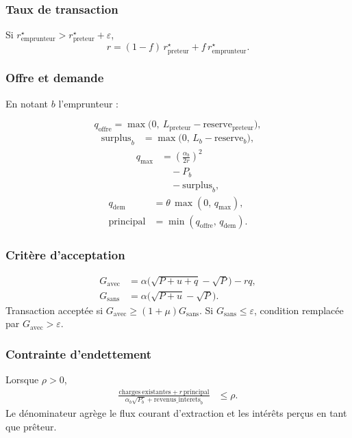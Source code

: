 \documentclass[10pt,a4paper]{article}
\begin{document}
\subsubsection{Taux de transaction}

Si \(r^\star_{\mathrm{emprunteur}} > r^\star_{\mathrm{preteur}} + \varepsilon\),
\[
r = (1-f)\,r^\star_{\mathrm{preteur}} + f\,r^\star_{\mathrm{emprunteur}}.
\]

\subsubsection{Offre et demande}

En notant \(b\) l'emprunteur :

\[
q_{\mathrm{offre}} =
\max\!\bigl(0,\ L_{\mathrm{preteur}}-\mathrm{reserve}_{\mathrm{preteur}}\bigr),
\]
\begin{align*}
\mathrm{surplus}_b
&=
\max\!\bigl(
0,\,
L_b-\mathrm{reserve}_b
\bigr),
\end{align*}
\begin{align*}
q_{\max}
&=
\left(\frac{\alpha_b}{2r}\right)^2\\
&\quad - P_b\\
&\quad - \mathrm{surplus}_b,
\end{align*}
\begin{align*}
q_{\mathrm{dem}} &= \theta\,\max(0,\,q_{\max}),\\
\mathrm{principal} &= \min(q_{\mathrm{offre}},\,q_{\mathrm{dem}}).
\end{align*}

\subsubsection{Critère d'acceptation}

\begin{align*}
G_{\mathrm{avec}} &= \alpha\bigl(\sqrt{P+u+q}-\sqrt P\bigr)-rq,\\
G_{\mathrm{sans}} &= \alpha\bigl(\sqrt{P+u}-\sqrt P\bigr).
\end{align*}
Transaction acceptée si \(G_{\mathrm{avec}}\ge(1+\mu)G_{\mathrm{sans}}\). Si \(G_{\mathrm{sans}}\le\varepsilon\), condition remplacée par \(G_{\mathrm{avec}}>\varepsilon\).

\subsubsection{Contrainte d'endettement}

Lorsque \(\rho>0\),
\begin{align*}
\frac{
\mathrm{charges\ existantes} + r\,\mathrm{principal}
}{
\alpha_b\sqrt{P_b}
+ \mathrm{revenus\_interets}_b
}
&\le \rho.
\end{align*}
Le dénominateur agrège le flux courant d'extraction et les intérêts perçus en tant que prêteur.
\end{document}
